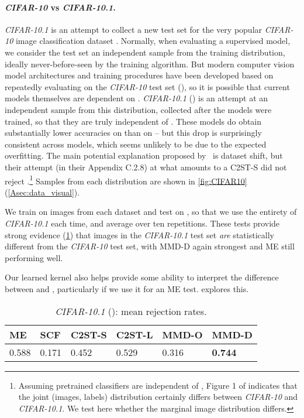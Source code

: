 \documentclass{article}
\begin{document}
\vspace{-1.5ex}\paragraph{\emph{CIFAR-10} vs \emph{CIFAR-10.1}.}
\emph{CIFAR-10.1} \citep{recht:imagenet} is an attempt to collect a new test set for the very popular \emph{CIFAR-10} image classification dataset \citep{cifar10}.
Normally, when evaluating a supervised model,
we consider the test set an independent sample from the training distribution, ideally never-before-seen by the training algorithm.
But modern computer vision model architectures and training procedures have been developed based on repeatedly evaluating on the \emph{CIFAR-10} test set (),
so it is possible that current models themselves are dependent on .
\emph{CIFAR-10.1} () is an attempt at an independent sample from this distribution, collected after the models were trained, so that they are truly independent of .
These models do obtain substantially lower accuracies on  than on  -- but this drop is surprisingly consistent across models, which seems unlikely to be due to the expected overfitting.
The main potential explanation proposed by \citeauthor{recht:imagenet}\ is dataset shift,
but their attempt (in their Appendix C.2.8) at what amounts to a C2ST-S did not reject .\footnote{Assuming pretrained classifiers are independent of , Figure 1 of \citet{recht:imagenet} indicates that the joint (images, labels) distribution certainly differs between \emph{CIFAR-10} and \emph{CIFAR-10.1}. We test here whether the marginal image distribution differs.}
Samples from each distribution are shown in \cref{fig:CIFAR10} (\cref{Asec:data_visual}).

We train on  images from each dataset and test on , so that we use the entirety of \emph{CIFAR-10.1} each time, and average over ten repetitions.
These tests provide strong evidence (\cref{tab:cifar10_RES}) that images in the \emph{CIFAR-10.1} test set \emph{are} statistically different from the \emph{CIFAR-10} test set,
with MMD-D again strongest
and ME still performing well.

Our learned kernel also helps provide some ability to interpret the difference between  and ,
particularly if we use it for an ME test.
 explores this.


\begin{table}[t!]
  \centering
  \footnotesize
  \caption{\emph{CIFAR-10.1} (): mean rejection rates.}
  \vspace{1mm}
    \begin{tabular}{llllll}
    \toprule
ME & SCF & C2ST-S & C2ST-L & MMD-O & MMD-D \\
    \midrule
0.588 & 0.171 & 0.452 & 0.529 & 0.316 & {\bf 0.744} \\
    \bottomrule
    \end{tabular}\label{tab:cifar10_RES}\vspace{-1em}
\end{table}
\end{document}
